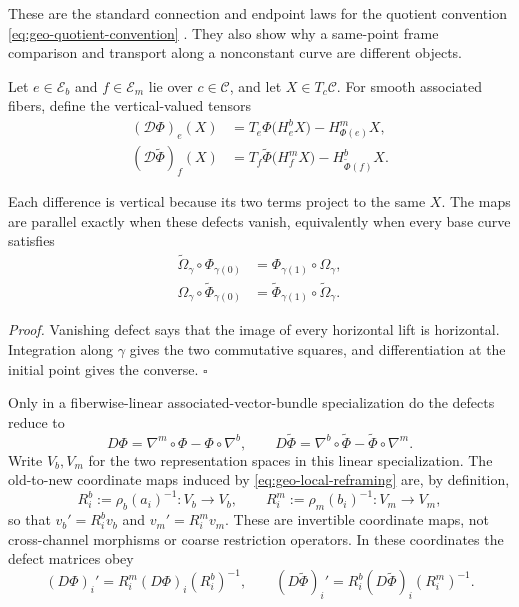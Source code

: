 These are the standard connection and endpoint laws for the quotient convention
\eqref{eq:geo-quotient-convention} \citep{Kobayashi1963,Nakahara2003}.  They also show why a
same-point frame comparison and transport along a nonconstant curve are different objects.

Let $e\in\mathcal E_b$ and $f\in\mathcal E_m$ lie over $c\in\mathcal C$, and let
$X\in T_c\mathcal C$.  For smooth associated fibers, define the vertical-valued tensors
\begin{align}
(\mathcal D\Phi)_e(X)
&=T_e\Phi\bigl(H_e^bX\bigr)-H_{\Phi(e)}^mX,
\label{eq:geo-nonlinear-defect-phi}\\
(\mathcal D\widetilde\Phi)_f(X)
&=T_f\widetilde\Phi\bigl(H_f^mX\bigr)-H_{\widetilde\Phi(f)}^bX.
\label{eq:geo-nonlinear-defect-tildephi}
\end{align}

Each difference is vertical because its two terms project to the same $X$.  The maps are parallel
exactly when these defects vanish, equivalently when every base curve satisfies
\begin{align}
\widetilde\Omega_\gamma\circ\Phi_{\gamma(0)}
&=\Phi_{\gamma(1)}\circ\Omega_\gamma,
\label{eq:geo-phi-parallelness}\\
\Omega_\gamma\circ\widetilde\Phi_{\gamma(0)}
&=\widetilde\Phi_{\gamma(1)}\circ\widetilde\Omega_\gamma.
\label{eq:geo-tildephi-parallelness}
\end{align}

\noindent\emph{Proof.}
Vanishing defect says that the image of every horizontal lift is horizontal.  Integration along
$\gamma$ gives the two commutative squares, and differentiation at the initial point gives the
converse. \hfill$\square$

Only in a fiberwise-linear associated-vector-bundle specialization do the defects reduce to
\begin{equation}
D\Phi=\nabla^m\circ\Phi-\Phi\circ\nabla^b,
\qquad
D\widetilde\Phi=\nabla^b\circ\widetilde\Phi-\widetilde\Phi\circ\nabla^m.
\label{eq:geo-linear-covariant-defects}
\end{equation}
Write $V_b,V_m$ for the two representation spaces in this linear specialization.  The
old-to-new coordinate maps induced by \eqref{eq:geo-local-reframing} are, by definition,
\begin{equation}
R_i^b:=\rho_b(a_i)^{-1}:V_b\longrightarrow V_b,
\qquad
R_i^m:=\rho_m(b_i)^{-1}:V_m\longrightarrow V_m,
\label{eq:geo-linear-coordinate-maps}
\end{equation}
so that $v_b'=R_i^bv_b$ and $v_m'=R_i^mv_m$.  These are invertible coordinate maps, not
cross-channel morphisms or coarse restriction operators.  In these coordinates the defect
matrices obey
\begin{equation}
(D\Phi)_i'=R_i^m(D\Phi)_i(R_i^b)^{-1},
\qquad
(D\widetilde\Phi)_i'=R_i^b(D\widetilde\Phi)_i(R_i^m)^{-1}.
\label{eq:geo-defect-gauge-laws}
\end{equation}

